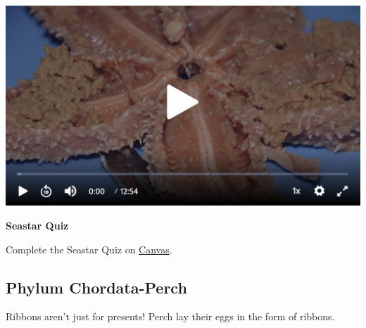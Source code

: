 \documentclass[
]{book}
\begin{document}
\includegraphics{images/Lab6_Seastar_Dissection_Video2.png}

\textbf{Seastar Quiz}

Complete the Seastar Quiz on \href{https://canvas.ubc.ca/}{Canvas}.

\hypertarget{phylum-chordata-perch-1}{%
\subsection*{Phylum Chordata-Perch}\label{phylum-chordata-perch-1}}

Ribbons aren't just for presents! Perch lay their eggs in the form of ribbons.
\end{document}

